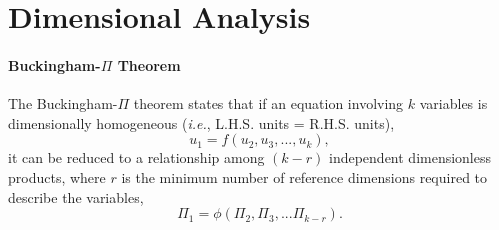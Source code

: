 \documentclass[a4paper]{article}
\begin{document}
\section{Dimensional Analysis}
\paragraph{Buckingham-$\Pi$ Theorem} The Buckingham-$\Pi$ theorem states that if an equation involving $k$ variables is dimensionally homogeneous (\textit{i.e.}, L.H.S. units = R.H.S. units), 
\[
    u_1 = f(u_2, u_3, ..., u_k),
\]
it can be reduced to a relationship among $(k-r)$ independent dimensionless products, where $r$ is the minimum number of reference dimensions required to describe the variables,
\[
    \Pi_1 = \phi(\Pi_2, \Pi_3, ... \Pi_{k-r}).
\]



    
\end{document}

